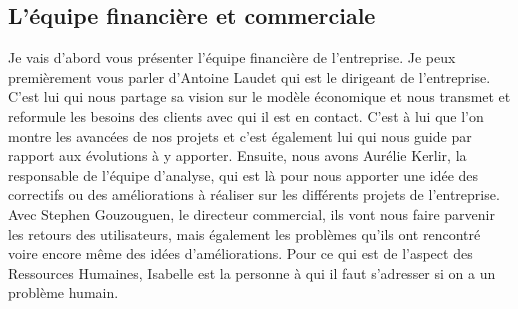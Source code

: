 \documentclass[12pt,oneside,noprintercorrection]{iut}
\begin{document}
\clearpage

\subsection{L'équipe financière et commerciale}
Je vais d'abord vous présenter l'équipe financière de l'entreprise. Je peux premièrement vous parler d'Antoine Laudet qui est le dirigeant de l'entreprise. C'est lui qui nous partage sa vision sur le modèle économique et nous transmet et reformule les besoins des clients avec qui il est en contact. C'est à lui que l'on montre les avancées de nos projets et c'est également lui qui nous guide par rapport aux évolutions à y apporter. Ensuite, nous avons Aurélie Kerlir, la responsable de l'équipe d'analyse, qui est là pour nous apporter une idée des correctifs ou des améliorations à réaliser sur les différents projets de l'entreprise. Avec Stephen Gouzouguen, le directeur commercial, ils vont nous faire parvenir les retours des utilisateurs, mais également les problèmes qu'ils ont rencontré voire encore même des idées d'améliorations.
Pour ce qui est de l'aspect des Ressources Humaines, Isabelle est la personne à qui il faut s'adresser si on a un problème humain.
\end{document}
